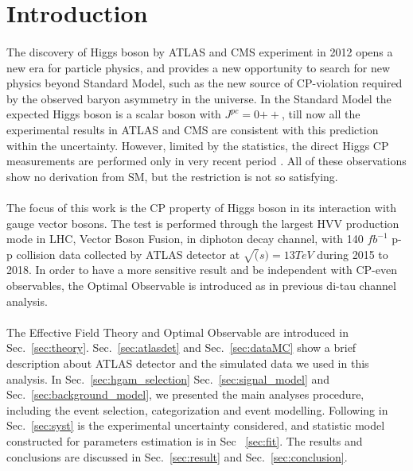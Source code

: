 \section{Introduction}
\label{sec:intro}


\paragraph{}The discovery of Higgs boson by ATLAS and CMS experiment in 2012 opens a new era for particle physics, and provides a new opportunity to search for new physics beyond Standard Model, such as the new source of CP-violation required by the observed baryon asymmetry in the universe. In the Standard Model the expected Higgs boson is a scalar boson with $J^{pc} = 0{++}$, till now all the experimental results in ATLAS and CMS are consistent with this prediction within the uncertainty.  However, limited by the statistics, the direct Higgs CP measurements are performed only in very recent period  \cite{HIGG-VBFHtautau}\cite{HIGG-ttHyy}\cite{CMS-HIG-17-034}\cite{CMS-HIG-19-013}. All of these observations show no derivation from SM, but the restriction is not so satisfying. 


\paragraph{} The focus of this work is the CP property of Higgs boson in its interaction with gauge vector bosons. The test is performed through the largest HVV production mode in LHC, Vector Boson Fusion, in diphoton decay channel, with 140 $fb^{-1}$ p-p collision data collected by ATLAS detector at $\sqrt(s)=13TeV$ during 2015 to 2018. In order to have a more sensitive result and be independent with CP-even observables, the Optimal Observable is introduced as in previous di-tau channel analysis. 



\paragraph{}The Effective Field Theory and Optimal Observable are introduced in Sec.~\ref{sec:theory}. Sec.~\ref{sec:atlasdet} and Sec.~\ref{sec:dataMC} show a brief description about ATLAS detector and the simulated data we used in this analysis. In Sec.~\ref{sec:hgam_selection} Sec.~\ref{sec:signal_model} and Sec.~\ref{sec:background_model}, we presented the main analyses procedure, including the event selection, categorization and event modelling. Following in Sec.~\ref{sec:syst} is the experimental uncertainty considered, and statistic model constructed for parameters estimation is in Sec ~\ref{sec:fit}. The results and conclusions are discussed in Sec.~\ref{sec:result} and Sec.~\ref{sec:conclusion}.  

